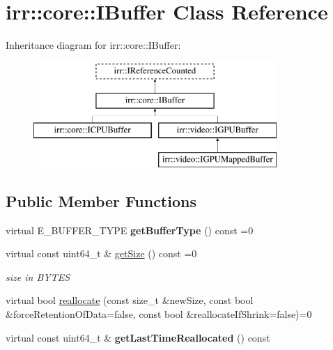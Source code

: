 \hypertarget{classirr_1_1core_1_1IBuffer}{}\section{irr\+:\+:core\+:\+:I\+Buffer Class Reference}
\label{classirr_1_1core_1_1IBuffer}
Inheritance diagram for irr\+:\+:core\+:\+:I\+Buffer\+:\begin{figure}[H]
\begin{center}
\leavevmode
\includegraphics[height=4.000000cm]{classirr_1_1core_1_1IBuffer}
\end{center}
\end{figure}
\subsection*{Public Member Functions}
\begin{DoxyCompactItemize}
\item 
virtual E\+\_\+\+B\+U\+F\+F\+E\+R\+\_\+\+T\+Y\+PE {\bfseries get\+Buffer\+Type} () const  =0\hypertarget{classirr_1_1core_1_1IBuffer_a0df30ec3bd50265def2cc33c5e476479}{}\label{classirr_1_1core_1_1IBuffer_a0df30ec3bd50265def2cc33c5e476479}

\item 
virtual const uint64\+\_\+t \& \hyperlink{classirr_1_1core_1_1IBuffer_afdbb76c21eaf7ba4396eb68edd72a0c5}{get\+Size} () const  =0\hypertarget{classirr_1_1core_1_1IBuffer_afdbb76c21eaf7ba4396eb68edd72a0c5}{}\label{classirr_1_1core_1_1IBuffer_afdbb76c21eaf7ba4396eb68edd72a0c5}

\begin{DoxyCompactList}\small\item\em size in B\+Y\+T\+ES \end{DoxyCompactList}\item 
virtual bool \hyperlink{classirr_1_1core_1_1IBuffer_a725232c3869f003574d73707f40d7412}{reallocate} (const size\+\_\+t \&new\+Size, const bool \&force\+Retention\+Of\+Data=false, const bool \&reallocate\+If\+Shrink=false)=0
\item 
virtual const uint64\+\_\+t \& {\bfseries get\+Last\+Time\+Reallocated} () const \hypertarget{classirr_1_1core_1_1IBuffer_a5b4589f99466bfd84e578775289ef637}{}\label{classirr_1_1core_1_1IBuffer_a5b4589f99466bfd84e578775289ef637}

\end{DoxyCompactItemize}
